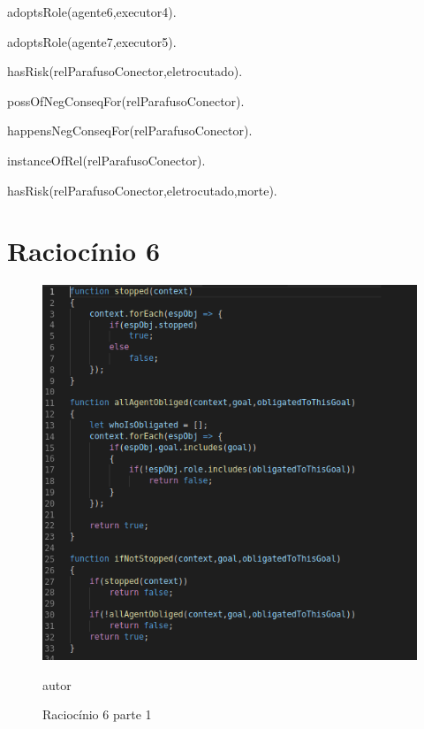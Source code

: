 adoptsRole(agente6,executor4).

adoptsRole(agente7,executor5).

hasRisk(relParafusoConector,eletrocutado).

possOfNegConseqFor(relParafusoConector).

happensNegConseqFor(relParafusoConector).

instanceOfRel(relParafusoConector).

hasRisk(relParafusoConector,eletrocutado,morte).

\section{Raciocínio 6}


\begin{figure}[H]
  \centering
  \caption{Raciocínio 6 parte 1}
  \includegraphics[width=0.8\linewidth]{figure/algjs} 
  \begin{center}
  	autor
  \end{center}
  \label{atividiagram2}
\end{figure}


